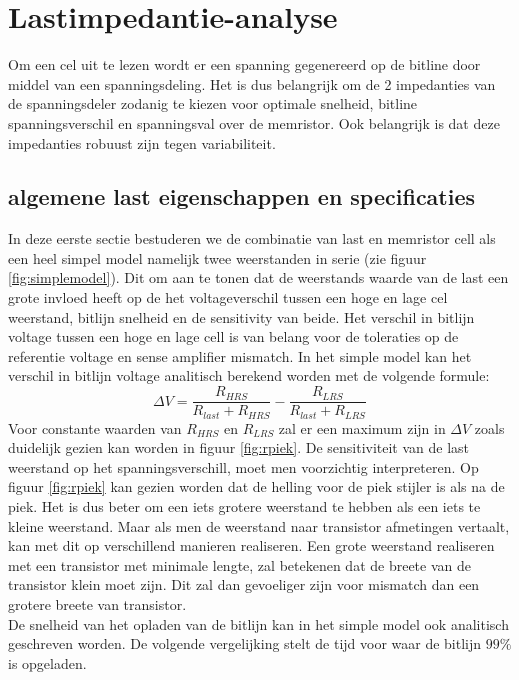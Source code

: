 \chapter{Lastimpedantie-analyse}
\label{loadanalysis}
Om een cel uit te lezen wordt er een spanning gegenereerd op de bitline door middel van een spanningsdeling.
Het is dus belangrijk om de 2 impedanties van de spanningsdeler zodanig te kiezen voor optimale snelheid, bitline spanningsverschil en spanningsval over de memristor.
Ook belangrijk is dat deze impedanties robuust zijn tegen variabiliteit.

\section{algemene last eigenschappen en specificaties}\label{sec:simplemodel}
In deze eerste sectie bestuderen we de combinatie van last en memristor cell als een heel simpel model namelijk twee weerstanden in serie (zie figuur \ref{fig:simplemodel}). Dit om aan te tonen dat de weerstands waarde van de last een grote invloed heeft op de het voltageverschil tussen een hoge en lage cel weerstand, bitlijn snelheid en de sensitivity van beide.
Het verschil in bitlijn voltage tussen een hoge en lage cell is van belang voor de toleraties op de referentie voltage en sense amplifier mismatch. In het simple model kan het verschil in bitlijn voltage analitisch berekend worden met de volgende formule:
\begin{equation}
 \Delta V = \frac{R_{HRS}}{R_{last}+R_{HRS}} - \frac{R_{LRS}}{R_{last}+R_{LRS}}
\end{equation} 
Voor constante waarden van $R_{HRS}$ en $R_{LRS}$ zal er een maximum zijn in $ \Delta V$ zoals duidelijk gezien kan worden in figuur \ref{fig:rpiek}. De sensitiviteit van de last weerstand op het spanningsverschill, moet men voorzichtig interpreteren. Op figuur \ref{fig:rpiek} kan gezien worden dat de helling voor de piek stijler is als na de piek. Het is dus beter om een iets grotere weerstand te hebben als een iets te kleine weerstand. Maar als men de weerstand naar transistor afmetingen vertaalt, kan met dit op verschillend manieren realiseren. Een grote weerstand realiseren met een transistor met minimale lengte, zal betekenen dat de breete van de transistor klein moet zijn. Dit zal dan gevoeliger zijn voor mismatch dan een grotere breete van transistor.\\
De snelheid van het opladen van de bitlijn kan in het simple model ook analitisch geschreven worden. De volgende vergelijking stelt de tijd voor waar de bitlijn $99\%$ is opgeladen.

